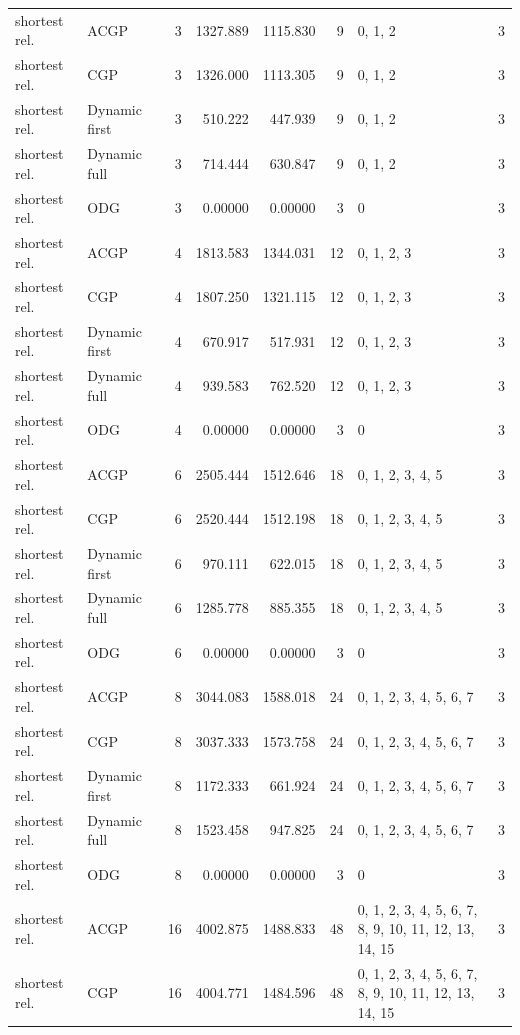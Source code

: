 \documentclass[10pt,a4paper]{article}
\begin{document}
\begin{longtable}{@{}p{23mm}p{29mm}rrrrp{36mm}r@{}}
shortest rel. & ACGP & 3 & 1327.889 & 1115.830 & 9 & 0, 1, 2 & 3 \\
shortest rel. & CGP & 3 & 1326.000 & 1113.305 & 9 & 0, 1, 2 & 3 \\
shortest rel. & Dynamic first & 3 & 510.222 & 447.939 & 9 & 0, 1, 2 & 3 \\
shortest rel. & Dynamic full & 3 & 714.444 & 630.847 & 9 & 0, 1, 2 & 3 \\
shortest rel. & ODG & 3 & 0.00000 & 0.00000 & 3 & 0 & 3 \\
shortest rel. & ACGP & 4 & 1813.583 & 1344.031 & 12 & 0, 1, 2, 3 & 3 \\
shortest rel. & CGP & 4 & 1807.250 & 1321.115 & 12 & 0, 1, 2, 3 & 3 \\
shortest rel. & Dynamic first & 4 & 670.917 & 517.931 & 12 & 0, 1, 2, 3 & 3 \\
shortest rel. & Dynamic full & 4 & 939.583 & 762.520 & 12 & 0, 1, 2, 3 & 3 \\
shortest rel. & ODG & 4 & 0.00000 & 0.00000 & 3 & 0 & 3 \\
shortest rel. & ACGP & 6 & 2505.444 & 1512.646 & 18 & 0, 1, 2, 3, 4, 5 & 3 \\
shortest rel. & CGP & 6 & 2520.444 & 1512.198 & 18 & 0, 1, 2, 3, 4, 5 & 3 \\
shortest rel. & Dynamic first & 6 & 970.111 & 622.015 & 18 & 0, 1, 2, 3, 4, 5 & 3 \\
shortest rel. & Dynamic full & 6 & 1285.778 & 885.355 & 18 & 0, 1, 2, 3, 4, 5 & 3 \\
shortest rel. & ODG & 6 & 0.00000 & 0.00000 & 3 & 0 & 3 \\
shortest rel. & ACGP & 8 & 3044.083 & 1588.018 & 24 & 0, 1, 2, 3, 4, 5, 6, 7 & 3 \\
shortest rel. & CGP & 8 & 3037.333 & 1573.758 & 24 & 0, 1, 2, 3, 4, 5, 6, 7 & 3 \\
shortest rel. & Dynamic first & 8 & 1172.333 & 661.924 & 24 & 0, 1, 2, 3, 4, 5, 6, 7 & 3 \\
shortest rel. & Dynamic full & 8 & 1523.458 & 947.825 & 24 & 0, 1, 2, 3, 4, 5, 6, 7 & 3 \\
shortest rel. & ODG & 8 & 0.00000 & 0.00000 & 3 & 0 & 3 \\
shortest rel. & ACGP & 16 & 4002.875 & 1488.833 & 48 & 0, 1, 2, 3, 4, 5, 6, 7, 8, 9, 10, 11, 12, 13, 14, 15 & 3 \\
shortest rel. & CGP & 16 & 4004.771 & 1484.596 & 48 & 0, 1, 2, 3, 4, 5, 6, 7, 8, 9, 10, 11, 12, 13, 14, 15 & 3 \\

\end{longtable}
\end{document}
